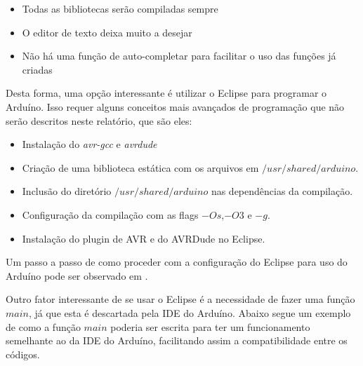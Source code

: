 \begin{itemize}
	\item Todas as bibliotecas serão compiladas sempre
	\item O editor de texto deixa muito a desejar
	\item Não há uma função de auto-completar para facilitar o uso das funções já criadas
\end{itemize}


Desta forma, uma opção interessante é utilizar o Eclipse para programar o Arduíno. Isso requer alguns conceitos mais avançados de programação que não serão descritos neste relatório, que são eles:

\begin{itemize}
	\item Instalação do \textit{avr-gcc} e \textit{avrdude}
	\item Criação de uma biblioteca estática com os arquivos em $/usr/shared/arduino$.
	\item Inclusão do diretório $/usr/shared/arduino$ nas dependências da compilação.
	\item Configuração da compilação com as flags $-Os$,$-O3$ e $-g$.
	\item Instalação do plugin de AVR e do AVRDude no Eclipse.
\end{itemize}


Um passo a passo de como proceder com a configuração do Eclipse para uso do Arduíno pode ser observado em \cite{eclipse}.

Outro fator interessante de se usar o Eclipse é a necessidade de fazer uma função $main$, já que esta é descartada pela IDE do Arduíno. Abaixo segue um exemplo de como a função $main$ poderia ser escrita para ter um funcionamento semelhante ao da IDE do Arduíno, facilitando assim a compatibilidade entre os códigos.

